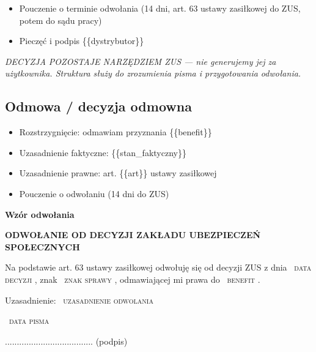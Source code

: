 \documentclass[11pt,a4paper]{article}
\newcommand{\Pole}[1]{%
  \textcolor{szary}{\dotfill}\,%
  {\scriptsize\textcolor{szary}{\textsc{#1}}}%
}
\newcommand{\NaglowekPisma}[1]{%
  \par\vspace{0.8em}%
  \begin{center}%
    {\large\bfseries\MakeUppercase{#1}}%
  \end{center}%
  \vspace{0.4em}%
}
\begin{document}
\begin{itemize}\item Pouczenie o terminie odwołania (14 dni, art. 63 ustawy zasiłkowej do ZUS, potem do sądu pracy)\end{itemize}

\begin{itemize}\item Pieczęć i podpis \{\{dystrybutor\}\}\end{itemize}

{\footnotesize\color{szary}\itshape DECYZJA POZOSTAJE NARZĘDZIEM ZUS --- nie generujemy jej za użytkownika.
Struktura służy do zrozumienia pisma i przygotowania odwołania.
}

\subsection*{Odmowa / decyzja odmowna}

\begin{itemize}\item Rozstrzygnięcie: odmawiam przyznania \{\{benefit\}\}\end{itemize}

\begin{itemize}\item Uzasadnienie faktyczne: \{\{stan\_faktyczny\}\}\end{itemize}

\begin{itemize}\item Uzasadnienie prawne: art. \{\{art\}\} ustawy zasiłkowej\end{itemize}

\begin{itemize}\item Pouczenie o odwołaniu (14 dni do ZUS)\end{itemize}

\textbf{Wzór odwołania}\par

\NaglowekPisma{ODWOŁANIE OD DECYZJI ZAKŁADU UBEZPIECZEŃ SPOŁECZNYCH}

Na podstawie art. 63 ustawy zasiłkowej odwołuję się od decyzji ZUS
z dnia \Pole{data decyzji}, znak \Pole{znak sprawy}, odmawiającej mi prawa do \Pole{benefit}.

Uzasadnienie:
\Pole{uzasadnienie odwolania}

\Pole{data pisma}
.....................................
(podpis)
\end{document}
